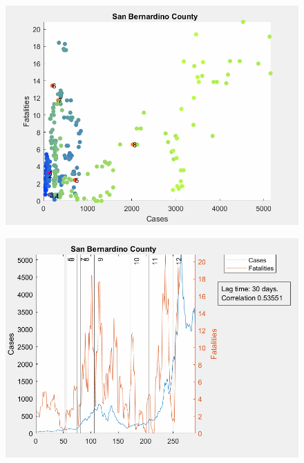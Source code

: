 \documentclass[12pt]{article}
\begin{document}
\begin{figure}[!h]
	\includegraphics[width=\linewidth]{images/san_bernardino_cases_fatalities_scatter-0lag.png}
	\caption{}
	\label{fig:images/san_bernardino_cases_fatalities_scatter-0lagLabel}
\end{figure}

\begin{figure}[!h]
	\includegraphics[width=\linewidth]{images/san_bernardino_cases_fatalities_line-30lag.png}
	\caption{}
	\label{fig:images/san_bernardino_cases_fatalities_line-30lagLabel}
\end{figure}	
	
\end{document}
